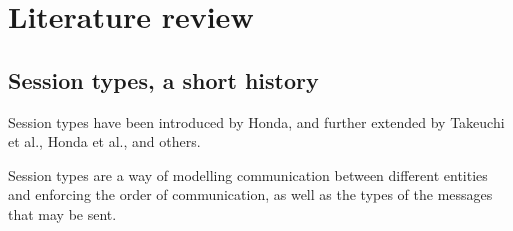 \section{Literature review}
\label{litreview}


\subsection{Session types, a short history}
\label{st}


Session types have been introduced by Honda\cite{HondaK:typdi}, and further extended by Takeuchi et al.\cite{HondaK:intblt1}, Honda et al.\cite{HondaK:lanptd}, and others.

Session types are a way of modelling communication between different entities and enforcing the order of communication, as well as the types of the messages that may be sent.



%


